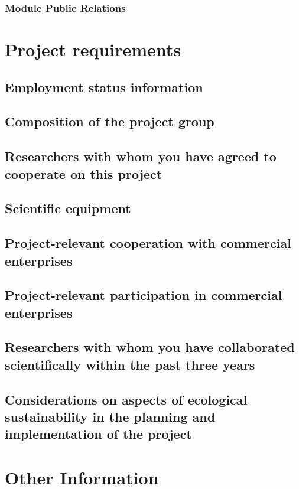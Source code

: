 \documentclass[english, 53.02]{proposal}
\begin{document}
\subsubsection{Module Public Relations}


\section{Project requirements}

\subsection{Employment status information}

\subsection{Composition of the project group}

\subsection{Researchers with whom you have agreed to cooperate on this project}

\subsection{Scientific equipment}

\subsection{Project-relevant cooperation with commercial enterprises}

\subsection{Project-relevant participation in commercial enterprises}

\subsection{Researchers with whom you have collaborated scientifically within the past three years}

\subsection{Considerations on aspects of ecological sustainability in the planning and implementation of the project}


\section{Other Information}
\end{document}
